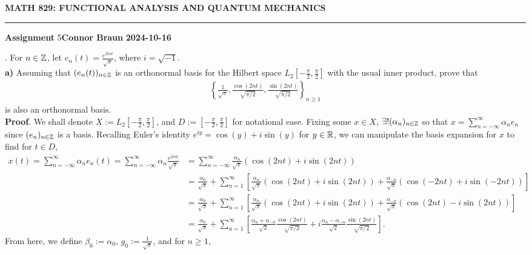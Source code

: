 \documentclass[10pt]{article}
\newcommand{\1}[1]{\mathbbm{1}_{#1}} \newcommand{\mc}[1]{\mathcal{#1}}
\begin{document}
    \begin{center}
        {\bf\large{MATH 829: FUNCTIONAL ANALYSIS AND QUANTUM MECHANICS}}
        \smallskip
        \hrule
        \smallskip
        {\bf Assignment} 5\hfill {\bf Connor Braun} \hfill {\bf 2024-10-16}
    \end{center}
    \vspace{5pt}
    . For $n\in\mathbb{Z}$, let $e_n(t)=\frac{e^{2int}}{\sqrt{\pi}}$, where $i=\sqrt{-1}$.\\[5pt]
    {\bf a)} Assuming that $(e_n(t))_{n\in\mathbb{Z}}$ is an orthonormal basis for the Hilbert space $L_2\left[-\frac{\pi}{2},\frac{\pi}{2}\right]$ with the usual inner product, prove that
    \begin{align*}
        \left\{\frac{1}{\sqrt{\pi}},\frac{\cos(2nt)}{\sqrt{\pi/2}},\frac{\sin(2nt)}{\sqrt{\pi/2}}\right\}_{n\geq 1}
    \end{align*}
    is also an orthonormal basis.\\[5pt]
    {\bf Proof}. We shall denote $X:=L_2\left[-\frac{\pi}{2},\frac{\pi}{2}\right]$, and $D:=\left[-\frac{\pi}{2},\frac{\pi}{2}\right]$ for notational ease. Fixing some $x\in X$, $\exists!(\alpha_n)_{n\in\mathbb{Z}}$ so that $x=\sum_{n=-\infty}^{\infty}\alpha_ne_n$ since $(e_n)_{n\in\mathbb{Z}}$ is a basis. 
    Recalling Euler's identity $e^{iy}=\cos(y)+i\sin(y)$ for $y\in\mathbb{R}$, we can manipulate the basis expansion for $x$ to find for $t\in D$,
    \begin{align*}
        x(t)=\sum_{n=-\infty}^\infty\alpha_ne_n(t)=\sum_{n=-\infty}^\infty\alpha_n\frac{e^{2int}}{\sqrt{\pi}}&=\sum_{n=-\infty}^\infty\frac{\alpha_n}{\sqrt{\pi}}(\cos(2nt)+i\sin(2nt))\\
        &=\frac{\alpha_0}{\sqrt{\pi}}+\sum_{n=1}^\infty\left[\frac{\alpha_n}{\sqrt{\pi}}(\cos(2nt)+i\sin(2nt))+\frac{\alpha_{-n}}{\sqrt{\pi}}(\cos(-2nt)+i\sin(-2nt))\right]\\
        &=\frac{\alpha_0}{\sqrt{\pi}}+\sum_{n=1}^\infty\left[\frac{\alpha_n}{\sqrt{\pi}}(\cos(2nt)+i\sin(2nt))+\frac{\alpha_{-n}}{\sqrt{\pi}}(\cos(2nt)-i\sin(2nt))\right]\\
        &=\frac{\alpha_0}{\sqrt{\pi}}+\sum_{n=1}^\infty\left[\frac{\alpha_n+\alpha_{-n}}{\sqrt{2}}\frac{\cos(2nt)}{\sqrt{\pi/2}}+i\frac{\alpha_n-\alpha_{-n}}{\sqrt{2}}\frac{\sin(2nt)}{\sqrt{\pi/2}}\right].
    \end{align*}
    From here, we define $\beta_0:=\alpha_0$, $g_0:=\frac{1}{\sqrt{\pi}}$, and for $n\geq 1$,
\end{document}
